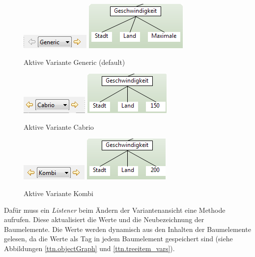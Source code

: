 \begin{figure}[h!]
  \begin{center}
    \includegraphics{4_2_Change_Var_Generic.png}
    \includegraphics[scale=0.8]{4_2_Change_Var_Generic_Tree.png}
  		  \caption{Aktive Variante Generic (default)}
     \label{ttn.generic}
  \end{center}
\end{figure}

\begin{figure}[h!]
  \begin{center}
    \includegraphics{4_2_Change_Var_Cabrio.png}
    \includegraphics[scale=0.9]{4_2_Change_Var_Cabrio_Tree.png}
  		  \caption{Aktive Variante Cabrio}
     \label{ttn.2}
  \end{center}
\end{figure}

\begin{figure}[h!]
  \begin{center}
    \includegraphics{4_2_Change_Var_Kombi.png}
    \includegraphics[scale=0.9]{4_2_Change_Var_Kombi_Tree.png}
  		  \caption{Aktive Variante Kombi}
     \label{ttn.3}
  \end{center}
\end{figure}

Dafür muss ein \textit{Listener} beim Ändern der Variantenansicht eine Methode aufrufen. Diese aktualisiert die Werte und die Neubezeichnung der Baumelemente. Die Werte werden dynamisch aus den Inhalten der Baumelemente gelesen, da die Werte als Tag in jedem Baumelement  gespeichert sind (siehe Abbildungen \ref{ttn.objectGraph} und \ref{ttn.treeitem_vars}).

